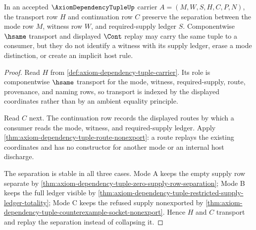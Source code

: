 \begin{theorem}
\label{thm:axiom-dependency-tuple-hsame-cont-scope}
In an accepted $\AxiomDependencyTupleUp$ carrier $A=(M,W,S,H,C,P,N)$, the
transport row $H$ and continuation row $C$ preserve the separation between the
mode row $M$, witness row $W$, and required-supply ledger $S$. Componentwise
$\hsame$ transport and displayed $\Cont$ replay may carry the same tuple to a
consumer, but they do not identify a witness with its supply ledger, erase a
mode distinction, or create an implicit host rule.
\end{theorem}
\begin{proof}
Read $H$ from \autoref{def:axiom-dependency-tuple-carrier}. Its role is
componentwise $\hsame$ transport for the mode, witness, required-supply, route,
provenance, and naming rows, so transport is indexed by the displayed
coordinates rather than by an ambient equality principle.

Read $C$ next. The continuation row records the displayed routes by which a
consumer reads the mode, witness, and required-supply ledger. Apply
\autoref{thm:axiom-dependency-tuple-route-nonexport}: a route replays the
existing coordinates and has no constructor for another mode or an internal
host discharge.

The separation is stable in all three cases. Mode A keeps the empty supply row
separate by \autoref{thm:axiom-dependency-tuple-zero-supply-row-separation};
Mode B keeps the full ledger visible by
\autoref{thm:axiom-dependency-tuple-restricted-supply-ledger-totality}; Mode C
keeps the refused supply nonexported by
\autoref{thm:axiom-dependency-tuple-counterexample-socket-nonexport}. Hence
$H$ and $C$ transport and replay the separation instead of collapsing it.
\end{proof}

